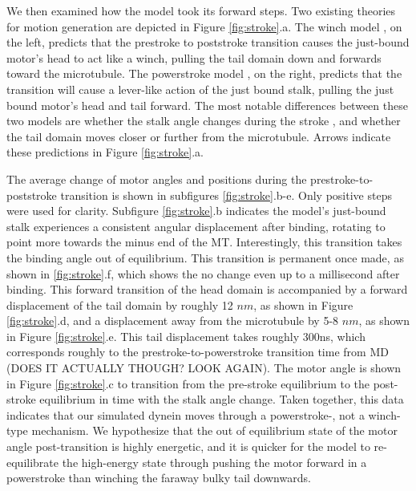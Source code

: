 \documentclass[9pt,twocolumn,twoside]{article}
\begin{document}
We then examined how the model took its forward steps. Two existing theories for motion generation are depicted in Figure \ref{fig:stroke}.a. The winch model \cite{carterwinch, uenoem, sarlahmodel, nicastro, kinoshitaPSwinch, lippert}, on the left, predicts that the prestroke to poststroke transition causes the just-bound motor's head to act like a winch, pulling the tail domain down and forwards toward the microtubule. The powerstroke model \cite{mallikps, burgessknight, robertspowerstroke, burgess-paper}, on the right, predicts that the transition will cause a lever-like action of the just bound stalk, pulling the just bound motor's head and tail forward. The most notable differences between these two models are whether the stalk angle changes during the stroke \cite{lippert}, and whether the tail domain moves closer or further from the microtubule. Arrows indicate these predictions in Figure \ref{fig:stroke}.a.

The average change of motor angles and positions during the prestroke-to-poststroke transition is shown in subfigures \ref{fig:stroke}.b-e. Only positive steps were used for clarity. Subfigure \ref{fig:stroke}.b indicates the model's just-bound stalk experiences a consistent angular displacement after binding, rotating to point more towards the minus end of the MT. Interestingly, this transition takes the binding angle out of equilibrium. This transition is permanent once made, as shown in \ref{fig:stroke}.f, which shows the no change even up to a millisecond after binding. This forward transition of the head domain is accompanied by a forward displacement of the tail domain by roughly 12 $nm$, as shown in Figure \ref{fig:stroke}.d, and a displacement away from the microtubule by 5-8 $nm$, as shown in Figure \ref{fig:stroke}.e. This tail displacement takes roughly 300ns, which corresponds roughly to the prestroke-to-powerstroke transition time from MD \cite{mdstroke} (DOES IT ACTUALLY THOUGH? LOOK AGAIN). The motor angle is shown in Figure \ref{fig:stroke}.c to transition from the pre-stroke equilibrium to the post-stroke equilibrium in time with the stalk angle change. Taken together, this data indicates that our simulated dynein moves through a powerstroke-, not a winch-type mechanism. We hypothesize that the out of equilibrium state of the motor angle post-transition is highly energetic, and it is quicker for the model to re-equilibrate the high-energy state through pushing the motor forward in a powerstroke than winching the faraway bulky tail downwards.

\end{document}
